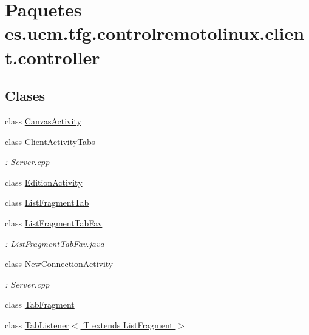 \hypertarget{namespacees_1_1ucm_1_1tfg_1_1controlremotolinux_1_1client_1_1controller}{\section{Paquetes es.\-ucm.\-tfg.\-controlremotolinux.\-client.\-controller}
\label{namespacees_1_1ucm_1_1tfg_1_1controlremotolinux_1_1client_1_1controller}
}
\subsection*{Clases}
\begin{DoxyCompactItemize}
\item 
class \hyperlink{classes_1_1ucm_1_1tfg_1_1controlremotolinux_1_1client_1_1controller_1_1CanvasActivity}{Canvas\-Activity}
\item 
class \hyperlink{classes_1_1ucm_1_1tfg_1_1controlremotolinux_1_1client_1_1controller_1_1ClientActivityTabs}{Client\-Activity\-Tabs}
\begin{DoxyCompactList}\small\item\em \-: Server.\-cpp \end{DoxyCompactList}\item 
class \hyperlink{classes_1_1ucm_1_1tfg_1_1controlremotolinux_1_1client_1_1controller_1_1EditionActivity}{Edition\-Activity}
\item 
class \hyperlink{classes_1_1ucm_1_1tfg_1_1controlremotolinux_1_1client_1_1controller_1_1ListFragmentTab}{List\-Fragment\-Tab}
\item 
class \hyperlink{classes_1_1ucm_1_1tfg_1_1controlremotolinux_1_1client_1_1controller_1_1ListFragmentTabFav}{List\-Fragment\-Tab\-Fav}
\begin{DoxyCompactList}\small\item\em \-: \hyperlink{ListFragmentTabFav_8java}{List\-Fragment\-Tab\-Fav.\-java} \end{DoxyCompactList}\item 
class \hyperlink{classes_1_1ucm_1_1tfg_1_1controlremotolinux_1_1client_1_1controller_1_1NewConnectionActivity}{New\-Connection\-Activity}
\begin{DoxyCompactList}\small\item\em \-: Server.\-cpp \end{DoxyCompactList}\item 
class \hyperlink{classes_1_1ucm_1_1tfg_1_1controlremotolinux_1_1client_1_1controller_1_1TabFragment}{Tab\-Fragment}
\item 
class \hyperlink{classes_1_1ucm_1_1tfg_1_1controlremotolinux_1_1client_1_1controller_1_1TabListener_3_01T_01extends_01ListFragment_01_4}{Tab\-Listener$<$ T extends List\-Fragment $>$}
\end{DoxyCompactItemize}
